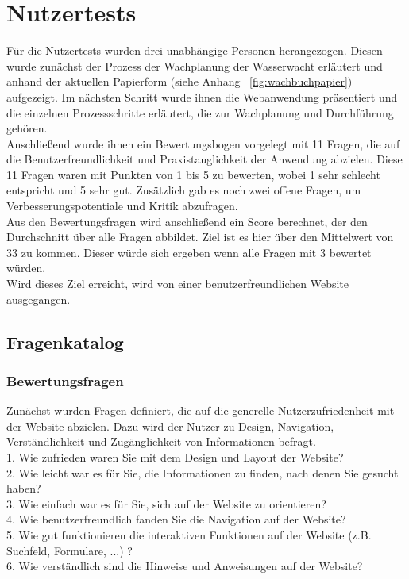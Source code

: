\documentclass[fontsize=12pt,openright,oneside,paper=a4,BCOR=1cm]{scrbook}
\begin{document}
\section{Nutzertests}

Für die Nutzertests wurden drei unabhängige Personen herangezogen. Diesen wurde zunächst der Prozess der Wachplanung der Wasserwacht erläutert und anhand der aktuellen Papierform (siehe Anhang ~\ref{fig:wachbuchpapier}) aufgezeigt. Im nächsten Schritt wurde ihnen die Webanwendung präsentiert und die einzelnen Prozessschritte erläutert, die zur Wachplanung und Durchführung gehören. \\
Anschließend wurde ihnen ein Bewertungsbogen vorgelegt mit 11 Fragen, die auf die Benutzerfreundlichkeit und Praxistauglichkeit der Anwendung abzielen. Diese 11 Fragen waren mit Punkten von 1 bis 5 zu bewerten, wobei 1 sehr schlecht entspricht und 5 sehr gut. Zusätzlich gab es noch zwei offene Fragen, um Verbesserungspotentiale und Kritik abzufragen. \\
Aus den Bewertungsfragen wird anschließend ein Score berechnet, der den Durchschnitt über alle Fragen abbildet. Ziel ist es hier über den Mittelwert von 33 zu kommen. Dieser würde sich ergeben wenn alle Fragen mit 3 bewertet würden. \\
Wird dieses Ziel erreicht, wird von einer benutzerfreundlichen Website ausgegangen.

\subsection{Fragenkatalog}
\subsubsection{Bewertungsfragen}
Zunächst wurden Fragen definiert, die auf die generelle Nutzerzufriedenheit mit der Website abzielen. Dazu wird der Nutzer zu Design, Navigation, Verständlichkeit und Zugänglichkeit von Informationen befragt.\\

1. Wie zufrieden waren Sie mit dem Design und Layout der Website?\\
2. Wie leicht war es für Sie, die Informationen zu finden, nach denen Sie gesucht haben?\\
3. Wie einfach war es für Sie, sich auf der Website zu orientieren?\\
4. Wie benutzerfreundlich fanden Sie die Navigation auf der Website?\\
5. Wie gut funktionieren die interaktiven Funktionen auf der Website (z.B. Suchfeld, Formulare, ...) ?\\
6. Wie verständlich sind die Hinweise und Anweisungen auf der Website?\\
\end{document}
